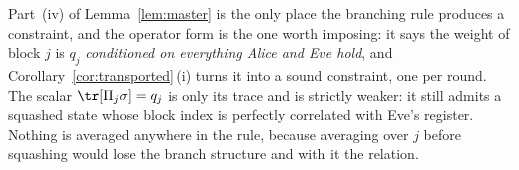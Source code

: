 
\begin{remark}
\label{rem:reading-master}
Part~(iv) of Lemma~\ref{lem:master} is the only place the branching rule
produces a constraint, and the operator form is the one worth imposing: it
says the weight of block $j$ is $q_j$ \emph{conditioned on everything Alice
and Eve hold}, and Corollary~\ref{cor:transported}\,(i) turns it into a sound
constraint, one per round. The scalar $\tr[\Pi_j\sigma]=q_j$ is only its trace
and is strictly weaker: it still admits a squashed state whose block index is
perfectly correlated with Eve's register. Nothing is averaged anywhere in the
rule, because averaging over $j$ before squashing would lose the branch
structure and with it the relation.
\end{remark}
